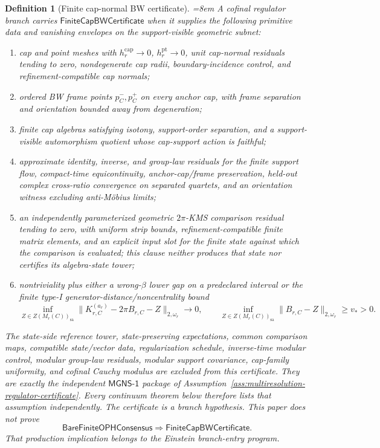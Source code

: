 \documentclass[11pt]{article}
\newtheorem{definition}[theorem]{Definition}
\begin{document}
\begin{definition}[Finite cap-normal BW certificate]\label{def:finite-cap-bw-certificate}\emergencystretch=8em\relax
A cofinal regulator branch carries \(\mathsf{FiniteCapBWCertificate}\) when it supplies the
following primitive data and vanishing envelopes on the support-visible geometric subnet:
\begin{enumerate}[label=\textup{C\arabic*.},leftmargin=2.4em]
\item cap and point meshes with \(h_r^{\mathrm{cap}}\to0\), \(h_r^{\mathrm{pt}}\to0\), unit
cap-normal residuals tending to zero, nondegenerate cap radii, boundary-incidence control, and
refinement-compatible cap normals;
\item ordered BW frame points \(p_C^-,p_C^+\) on every anchor cap, with frame separation and
orientation bounded away from degeneration;
\item finite cap algebras satisfying isotony, support-order separation, and a support-visible
automorphism quotient whose cap-support action is faithful;
\item approximate identity, inverse, and group-law residuals for the finite support flow,
compact-time equicontinuity, anchor-cap/frame preservation, held-out complex cross-ratio
convergence on separated quartets, and an orientation witness excluding anti-M\"obius limits;
\item an independently parameterized geometric \(2\pi\)-KMS comparison residual tending to zero,
with uniform strip bounds, refinement-compatible finite matrix elements, and an explicit input
slot for the finite state against which the comparison is evaluated; this clause neither produces
that state nor certifies its algebra-state tower;
\item nontriviality plus either a wrong-\(\beta\) lower gap on a predeclared interval or the
finite type-I generator-distance/noncentrality bound
\[
\inf_{Z\in Z(M_r(C))_{\mathrm{sa}}}
\|K_{r,C}^{(a_r)}-2\pi B_{r,C}-Z\|_{2,\omega_r}\to0,
\qquad
\inf_{Z\in Z(M_r(C))_{\mathrm{sa}}}\|B_{r,C}-Z\|_{2,\omega_r}\ge v_\ast>0 .
\]
\end{enumerate}
The state-side reference tower, state-preserving expectations, common
comparison maps, compatible state/vector data, regularization schedule,
inverse-time modular control, modular group-law residuals, modular support covariance,
cap-family uniformity, and cofinal Cauchy modulus are excluded from this
certificate. They are exactly the independent \(\mathsf{MGNS\text{-}1}\)
package of Assumption~\ref{ass:multiresolution-regulator-certificate}. Every
continuum theorem below therefore lists that assumption independently.
The certificate is a branch hypothesis. This paper does not prove
\[
\mathsf{BareFiniteOPHConsensus}\Longrightarrow \mathsf{FiniteCapBWCertificate}.
\]
That production implication belongs to the Einstein branch-entry program.
\end{definition}
\end{document}
